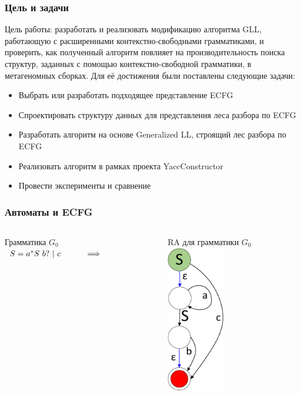 \documentclass{beamer}
\begin{document}
	\begin{frame} 
		\frametitle{Цель и задачи}
		Цель работы: разработать и реализовать модификацию алгоритма GLL, работающую с расширенными контекстно-свободными грамматиками, и проверить, как полученный алгоритм повлияет на производительность поиска структур, заданных с помощью контекстно-свободной грамматики, в метагеномных сборках.
		Для её достижения были поставлены следующие задачи:
		\begin{itemize}
			\item Выбрать или разработать подходящее представление ECFG
			\item Спроектировать структуру данных для представления леса разбора по ECFG
			\item Разработать алгоритм на основе Generalized LL, строящий лес разбора по ECFG
			\item Реализовать алгоритм в рамках проекта YaccConstructor
			\item Провести эксперименты и сравнение
		\end{itemize}
	\end{frame}

	\begin{frame} 
		\frametitle{Автоматы и ECFG}
		
		\begin{columns}
			\begin{column}{4cm}
				Грамматика $G_0$\\
				\vspace{10pt}
				$
				\begin{array}[b]{rl}
				S = a^{*} S\ b? \ | \ c \ \ \ \ \ \ \ \ \  \Longrightarrow
				\end{array}
				$
			\end{column}
			\begin{column}{3.3cm}
				RA для грамматики $G_0$\\
				\vspace{10pt}
				\includegraphics[width=2.5cm]{pictures/G0initialAutomaton.pdf}
			\end{column}
		\end{columns}
	\end{frame}
\end{document}
